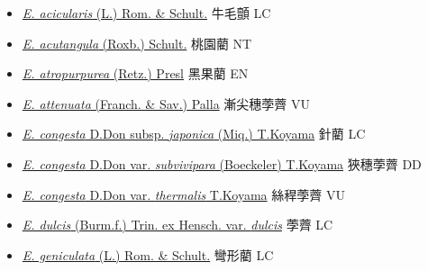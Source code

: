 \begin{itemize}
  \begin{itemize}
        \item[] \href{http://www.theplantlist.org/tpl1.1/search?q=Eleocharis+acicularis}{\textit{E. acicularis} (L.) Rom. \& Schult.}   牛毛顫 LC
        \item[] \href{http://www.theplantlist.org/tpl1.1/search?q=Eleocharis+acutangula}{\textit{E. acutangula} (Roxb.) Schult.}   桃園藺 NT
        \item[] \href{http://www.theplantlist.org/tpl1.1/search?q=Eleocharis+atropurpurea}{\textit{E. atropurpurea} (Retz.) Presl}   黑果藺 EN
        \item[] \href{http://www.theplantlist.org/tpl1.1/search?q=Eleocharis+attenuata}{\textit{E. attenuata} (Franch. \& Sav.) Palla}   漸尖穗荸薺 VU
        \item[] \href{http://www.theplantlist.org/tpl1.1/search?q=Eleocharis+congesta+subsp.+japonica}{\textit{E. congesta} D.Don subsp. \textit{japonica} (Miq.) T.Koyama}   針藺 LC
        \item[] \href{http://www.theplantlist.org/tpl1.1/search?q=Eleocharis+congesta+var.+subvivipara}{\textit{E. congesta} D.Don var. \textit{subvivipara} (Boeckeler) T.Koyama}   狹穗荸薺 DD
        \item[] \href{http://www.theplantlist.org/tpl1.1/search?q=Eleocharis+congesta+var.+thermalis}{\textit{E. congesta} D.Don var. \textit{thermalis} T.Koyama}   絲稈荸薺 VU
        \item[] \href{http://www.theplantlist.org/tpl1.1/search?q=Eleocharis+dulcis+var.+dulcis}{\textit{E. dulcis} (Burm.f.) Trin. ex Hensch. var. \textit{dulcis}}   荸薺 LC
        \item[] \href{http://www.theplantlist.org/tpl1.1/search?q=Eleocharis+geniculata}{\textit{E. geniculata} (L.) Rom. \& Schult.}   彎形藺 LC

\end{itemize}
\end{itemize}
